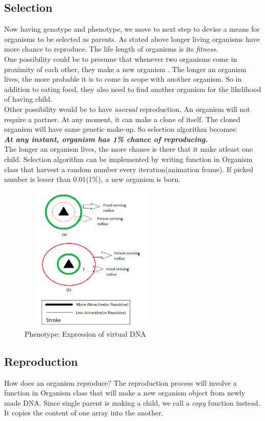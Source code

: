 \documentclass[conference]{IEEEtran}
\begin{document}
\subsection{Selection}
Now having genotype and phenotype, we move to next step to devise a means for organisms to be selected as parents. As stated above longer living organisms have more chance to reproduce. The life length of organisms is its \textit{fitness}.\\
One possibility could be to presume that whenever two organisms come in proximity of each other, they make a new organism \cite{improving-neuroevolution}. The longer an organism lives, the more probable it is to come in scope with another organism. So in addition to eating food, they also need to find another organism for the likelihood of having child.\\
Other possibility would be to have \textit{asexual} reproduction. An organism will not require a partner. At any moment, it can make a clone of itself. The cloned organism will have same genetic make-up. So selection algorithm becomes:\\
\textbf{\textit{At any instant, organism has 1\% chance of reproducing.}}\\
The longer an organism lives, the more chance is there that it make atleast one child. Selection algorithm can be implemented by writing function in Organism class that harvest a random number every iteration(animation frame). If picked number is lesser than 0.01(1\%), a new organism is born.
\begin{figure}
	\includegraphics[height=7cm,width=7cm]{phenotype.png}
	\caption{Phenotype: Expression of virtual DNA}
	\label{fig:phenotype}
\end{figure}
\subsection{Reproduction}
How does an organism reproduce? The reproduction process will involve a function in Organism class that will make a new organism object from newly made DNA. Since single parent is making a child, we call a \textit{copy} function instead. It copies the content of one array into the another.
\end{document}

